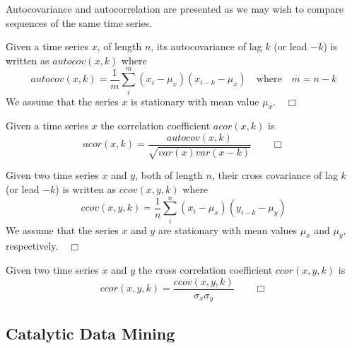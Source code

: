 Autocovariance and autocorrelation are presented as we may wish to
compare sequences of the same time series.
\begin{definition}[Autocovariance]\label{def:autocovar}
\begin{rm}
Given a time series $x$, of length $n$, its autocovariance of lag $k$
(or lead $-k$) is written as $autocov(x,k)$ where
\[
autocov(x,k) = \frac{1}{m} \sum_i^m (x_i - \mu_x) (x_{i-k} -
\mu_{x})\quad\mbox{where}\quad m = n-k 
\]
We assume that the series $x$ is stationary with mean value
$\mu_x$.$\quad\Box$ 
\end{rm}
\end{definition}

\begin{definition}\label{def:autocorrel}
\begin{rm}
Given a time series $x$ the correlation coefficient $acor(x,k)$ is
\[
acor(x,k) = \frac{autocov(x,k)}{\sqrt{var(x)var(x-k)}}\quad\quad\Box
\]
\end{rm}
\end{definition}

\begin{definition}\label{def:crosscovar}
\begin{rm}
Given two time series $x$ and $y$, both of length $n$, their
cross covariance of lag $k$
(or lead $-k$) is written as $ccov(x,y,k)$ where
\[
ccov(x,y,k) = \frac{1}{n} \sum_i^n (x_i - \mu_x) (y_{i-k} - \mu_y)
\]
We assume that the series $x$ and $y$ are stationary with mean values
$\mu_x$ and $\mu_y$, respectively.$\quad\Box$
\end{rm}
\end{definition}
 
\begin{definition}\label{def:crosscorrel}
\begin{rm}
Given two time series $x$ and $y$ the cross correlation coefficient $ccor(x,y,k)
$ is
\[
ccor(x,y,k) = \frac{ccov(x,y,k)}{\sigma_x \sigma_y}\quad\quad\Box
\]
\end{rm}
\end{definition}

\subsection{Catalytic Data Mining}\label{subsec:tl_catdm}

